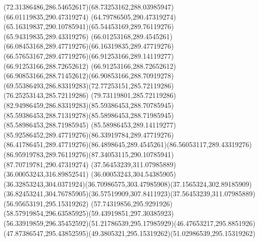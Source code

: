 {{	\curveto(72.31386486,286.54652617)(68.73253162,288.03985947)(66.01119835,290.47319274)
	\lineto(64.79786505,290.47319274)
	\curveto(65.16319837,290.10785941)(65.54453169,289.76119276)(65.94319835,289.43319276)
	\curveto(66.01253168,289.4545261)(66.08453168,289.47719276)(66.16319835,289.47719276)
	\curveto(66.57653167,289.47719276)(66.91253166,289.14119277)(66.91253166,288.72652612)
	\curveto(66.91253166,288.72652612)(66.90853166,288.71452612)(66.90853166,288.70919278)
	\curveto(69.55386493,286.83319283)(72.77253151,285.72119286)(76.25253143,285.72119286)
	\curveto(79.73119801,285.72119286)(82.94986459,286.83319283)(85.59386453,288.70785945)
	\curveto(85.59386453,288.71319278)(85.58986453,288.71985945)(85.58986453,288.71985945)
	\curveto(85.58986453,289.14119277)(85.92586452,289.47719276)(86.33919784,289.47719276)
	\curveto(86.41786451,289.47719276)(86.4898645,289.4545261)(86.56053117,289.43319276)
	\curveto(86.95919783,289.76119276)(87.34053115,290.10785941)(87.70719781,290.47319274)
	\moveto(37.56453239,311.07985889)
	\lineto(36.00053243,316.89852541)
	\lineto(36.00053243,304.54385905)
	\curveto(36.32853243,304.0371924)(36.70986575,303.47985908)(37.1565324,302.89185909)
	\curveto(36.82453241,304.76785905)(36.57519909,307.8411923)(37.56453239,311.07985889)
	\moveto(56.95653191,295.15319262)
	\curveto(57.74319856,295.9291926)(58.57919854,296.63585925)(59.43919851,297.30385923)
	\curveto(56.33919859,296.35452592)(51.21786539,295.17985929)(46.47653217,295.8851926)
	\curveto(47.87386547,295.43852595)(49.3805321,295.15319262)(51.02986539,295.15319262)
	\closepath
}
}
{
}
